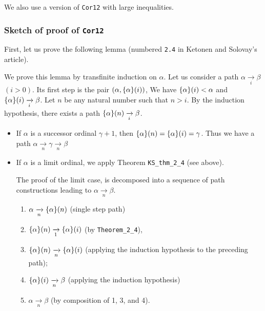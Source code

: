 


We  also use a version of \texttt{Cor12} with large inequalities.





\subsubsection{Sketch of proof of \texttt{Cor12}}

First, let us prove the following lemma (numbered \texttt{2.4} in Ketonen and Solovay's article).




We prove this lemma by transfinite induction on $\alpha$.
Let us consider a path $\alpha \xrightarrow [i]{} \beta$ $(i>0)$. Its first step is
the pair $(\alpha,\mbox{$\{\alpha\}(i)$})$, We have $\mbox{$\{\alpha\}(i)$}<\alpha$ and
$\mbox{$\{\alpha\}(i)$} \xrightarrow [i]{} \beta$. 
Let $n$ be any natural number such that $n>i$.
By the induction hypothesis, there exists a path $\mbox{$\{\alpha\}(n)$} \xrightarrow[i]{} \beta$.
\begin{itemize}
\item  If $\alpha$ is a successor ordinal $\gamma+1$, then $\mbox{$\{\alpha\}(n)$} =
\mbox{$\{\alpha\}(i)$}=\gamma$. Thus we have a path 
$\alpha  \xrightarrow [n]{}  \gamma \xrightarrow [n]{} \beta$
\item If $\alpha$ is a limit ordinal, we apply Theorem \texttt{KS\_thm\_2\_4} (see above).



  

The proof of the limit case, is decomposed into a sequence
of path constructions leading to $\alpha \xrightarrow[n]{} \beta$.

 \begin{enumerate}
 \item $\alpha \xrightarrow[n]{} \mbox{$\{\alpha\}(n)$}$ (single step path)
 \item $\mbox{$\{\alpha\}(n)$} \xrightarrow[1]{} \mbox{$\{\alpha\}(i)$}$ (by \texttt{Theorem\_2\_4}),
\item $\mbox{$\{\alpha\}(n)$} \xrightarrow[n]{} \mbox{$\{\alpha\}(i)$}$ (applying the induction hypothesis to the preceding path);
\item $\mbox{$\{\alpha\}(i)$} \xrightarrow[n]{} \beta$ (applying the induction hypothesis)
\item $\alpha \xrightarrow[n]{} \beta$ (by composition of 1, 3, and 4).


 \end{enumerate}


\end{itemize}


